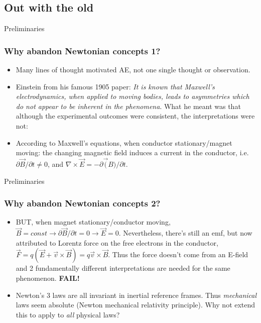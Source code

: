 \documentclass[xcolor=x11names,compress]{beamer}
\renewcommand{\(}{\begin{columns}}
\renewcommand{\)}{\end{columns}}
\newcommand{\<}[1]{\begin{column}{#1}}
\renewcommand{\>}{\end{column}}
\begin{document}
\subsection{Out with the old}
\begin{frame}{Preliminaries}
\frametitle{Why abandon Newtonian concepts 1?}
\begin{itemize}
\item Many lines of thought motivated AE, not one single thought or observation.
\item Einstein from his famous 1905 paper: {\it It is known that Maxwell's 
electrodynamics, when applied to moving bodies, leads to asymmetries which do not
appear to be inherent in the phenomena}.  What he meant was that although
the experimental outcomes were consistent, the interpretations were not:
\item According to Maxwell's equations, when conductor stationary/magnet moving:
the changing magnetic field induces a current in the conductor, 
i.e. $\partial \vec{B}/\partial t \neq 0$, and $\nabla \times \vec{E} = 
- \partial \vec(B)/\partial t$.
\end{itemize}
\end{frame}

\begin{frame}{Preliminaries}
\frametitle{Why abandon Newtonian concepts 2?}
\begin{itemize}
\item BUT, when magnet stationary/conductor moving, $\vec{B} =  const \rightarrow
\partial \vec{B}/\partial t = 0 \rightarrow \vec{E} = 0$. Nevertheless, there's
still an emf, but now attributed to Lorentz force on the free electrons in
the conductor, $\vec{F} = q \left( \vec{E} + \vec{v} \times \vec{B} \right) 
= q \vec{v} \times \vec{B}$.  Thus the force doesn't come from an E-field
and 2 fundamentally different interpretations are needed for the same phenomenon.  
{\color{red} {\bf FAIL!}}
\item Newton's 3 laws are all invariant in inertial reference frames.
Thus {\it mechanical} laws seem absolute (Newton mechanical relativity
principle). Why not extend this to apply to {\it all} physical laws?
\end{itemize}
\end{frame}
\end{document}
